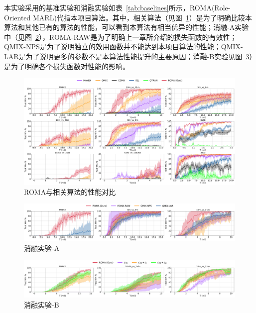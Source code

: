   本实验采用的基准实验和消融实验如表~\ref{tab:baselines}所示，ROMA(Role-Oriented MARL)代指本项目算法。其中，相关算法（见图~\ref{fig:performance-baselines}）是为了明确比较本算法和其他已有的算法的性能，可以看到本算法有相当优异的性能；消融-A实验中（见图~\ref{fig:performance-ablations-A}），ROMA-RAW是为了明确上一章所介绍的损失函数的有效性；QMIX-NPS是为了说明独立的效用函数并不能达到本项目算法的性能；QMIX-LAR是为了说明更多的参数不是本算法性能提升的主要原因；消融-B实验见图~\ref{fig:performance-ablations-B}）是为了明确各个损失函数对性能的影响。

\begin{figure}
    \includegraphics[width=\linewidth]{figures/learning-curve/learning_curve.pdf}
    \caption{ROMA与相关算法的性能对比}\label{fig:performance-baselines}
\end{figure}

\begin{figure}
    \includegraphics[width=\linewidth]{figures/learning-curve/ablation-A.pdf}
    \caption{消融实验-A}\label{fig:performance-ablations-A}
\end{figure}

\begin{figure}
    \includegraphics[width=\linewidth]{figures/learning-curve/ablation-B.pdf}
    \caption{消融实验-B}\label{fig:performance-ablations-B}
\end{figure}
  
